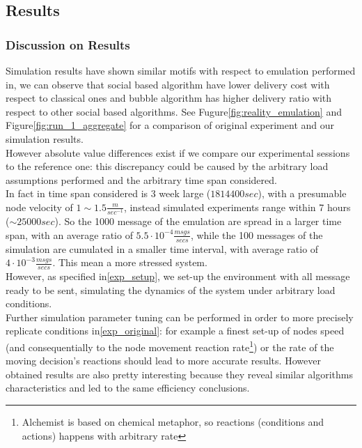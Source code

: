 \newpage
\subsection{Results}
\label{exp_results}

\subsubsection{Discussion on Results}
\label{exp_results_discussion}

Simulation results have shown similar motifs with respect to emulation performed in\cite{bubble}, we can observe that social based algorithm have lower delivery cost with respect to classical ones and bubble algorithm has higher delivery ratio with respect to other social based algorithms. See Fugure\ref{fig:reality_emulation} and Figure\ref{fig:run_1_aggregate} for a comparison of original experiment and our simulation results.\\
However absolute value differences exist if we compare our experimental sessions to the reference one: this discrepancy could be caused by the arbitrary load assumptions performed and the arbitrary time span considered.\\
In fact in\cite[6.2]{bubble} time span considered is 3 week large ($1814400 sec$), with a presumable node velocity of $1\sim1.5 \frac{m}{sec^{-1}}$, instead simulated experiments range within 7 hours ($\sim 25000 sec$). So the 1000 message of the emulation are spread in a larger time span, with an average ratio of $5.5\cdot 10^{-4} \frac{msgs}{secs}$, while the 100 messages of the simulation are cumulated in a smaller time interval, with average ratio of $4\cdot 10^{-3} \frac{msgs}{secs}$. This mean a more stressed system.\\
However, as specified in\ref{exp_setup}, we set-up the environment with all message ready to be sent, simulating the dynamics of the system under arbitrary load conditions.\\
Further simulation parameter tuning can be performed in order to more precisely replicate conditions in\ref{exp_original}: for example a finest set-up of nodes speed (and consequentially to the node movement reaction rate\footnote{Alchemist is based on chemical metaphor, so reactions (conditions and actions) happens with arbitrary rate}) or the rate of the moving decision's reactions should lead to more accurate results. However obtained results are also pretty interesting because they reveal similar algorithms characteristics and led to the same efficiency conclusions.\\

